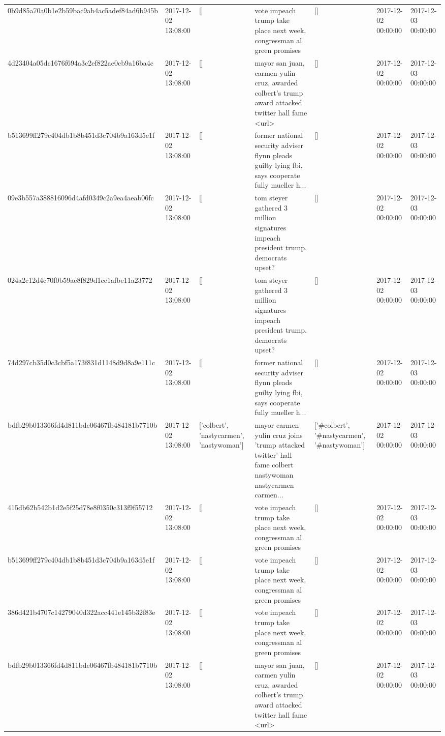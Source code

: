 \begin{tabular}{lllllll}
0b9d85a70a0b1e2b59bac9ab4ac5adef84ad6b945b & 2017-12-02 13:08:00 & [] & vote impeach trump take place next week, congressman al green promises & [] & 2017-12-02 00:00:00 & 2017-12-03 00:00:00 \\
4d23404a05dc1676f694a3c2ef822ae0cb9a16ba4c & 2017-12-02 13:08:00 & [] & mayor san juan, carmen yulín cruz, awarded colbert's trump award attacked twitter hall fame <url> & [] & 2017-12-02 00:00:00 & 2017-12-03 00:00:00 \\
b513699ff279c404db1b8b451d3c704b9a163d5e1f & 2017-12-02 13:08:00 & [] & former national security adviser flynn pleads guilty lying fbi, says cooperate fully mueller h... & [] & 2017-12-02 00:00:00 & 2017-12-03 00:00:00 \\
09e3b557a388816096d4afd0349c2a9ea4aeab06fc & 2017-12-02 13:08:00 & [] & tom steyer gathered 3 million signatures impeach president trump. democrats upset? & [] & 2017-12-02 00:00:00 & 2017-12-03 00:00:00 \\
024a2c12d4c70f0b59ae8f829d1ce1afbe11a23772 & 2017-12-02 13:08:00 & [] & tom steyer gathered 3 million signatures impeach president trump. democrats upset? & [] & 2017-12-02 00:00:00 & 2017-12-03 00:00:00 \\
74d297cb35d0c3cbf5a173f831d1148d9d8a9e111c & 2017-12-02 13:08:00 & [] & former national security adviser flynn pleads guilty lying fbi, says cooperate fully mueller h... & [] & 2017-12-02 00:00:00 & 2017-12-03 00:00:00 \\
bdfb29b013366fd4d811bde06467fb484181b7710b & 2017-12-02 13:08:00 & ['colbert', 'nastycarmen', 'nastywoman'] & mayor carmen yulín cruz joins 'trump attacked twitter' hall fame colbert nastywoman nastycarmen carmen... & ['#colbert', '#nastycarmen', '#nastywoman'] & 2017-12-02 00:00:00 & 2017-12-03 00:00:00 \\
415db62b542b1d2e5f25d78e8f0350c313f9f55712 & 2017-12-02 13:08:00 & [] & vote impeach trump take place next week, congressman al green promises & [] & 2017-12-02 00:00:00 & 2017-12-03 00:00:00 \\
b513699ff279c404db1b8b451d3c704b9a163d5e1f & 2017-12-02 13:08:00 & [] & vote impeach trump take place next week, congressman al green promises & [] & 2017-12-02 00:00:00 & 2017-12-03 00:00:00 \\
386d421b4707c14279040d322acc441e145b32f83e & 2017-12-02 13:08:00 & [] & vote impeach trump take place next week, congressman al green promises & [] & 2017-12-02 00:00:00 & 2017-12-03 00:00:00 \\
bdfb29b013366fd4d811bde06467fb484181b7710b & 2017-12-02 13:08:00 & [] & mayor san juan, carmen yulín cruz, awarded colbert's trump award attacked twitter hall fame <url> & [] & 2017-12-02 00:00:00 & 2017-12-03 00:00:00 \\

\end{tabular}
